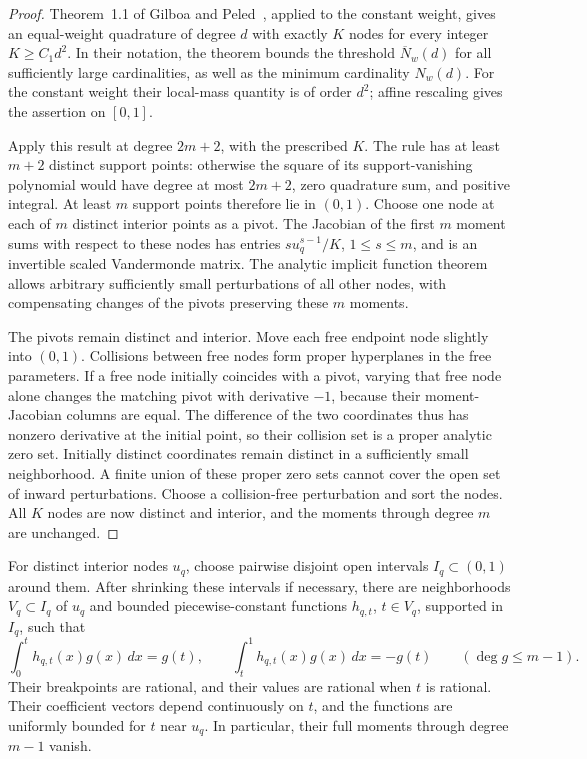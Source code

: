 \begin{proof}
Theorem~1.1 of Gilboa and Peled~\cite{gilboa2017}, applied to the
constant weight, gives an equal-weight quadrature of degree \(d\) with
exactly \(K\) nodes for every integer \(K\geq C_1d^2\).  In their
notation, the theorem bounds the threshold \(\overline N_w(d)\) for
all sufficiently large cardinalities, as well as the minimum
cardinality \(N_w(d)\).  For the constant weight their local-mass
quantity is of order \(d^2\); affine rescaling gives the assertion on
\([0,1]\).

Apply this result at degree \(2m+2\), with the prescribed \(K\).
The rule has at least \(m+2\) distinct support points: otherwise the
square of its support-vanishing polynomial would have degree at most
\(2m+2\), zero quadrature sum, and positive integral.  At least \(m\)
support points therefore lie in \((0,1)\).  Choose one node at each
of \(m\) distinct interior points as a pivot.  The Jacobian of the first
\(m\) moment sums with respect to these nodes has entries
\(s u_q^{s-1}/K\), \(1\leq s\leq m\), and is an invertible scaled
Vandermonde matrix.  The analytic implicit function theorem allows
arbitrary sufficiently small perturbations of all other nodes, with
compensating changes of the pivots preserving these \(m\) moments.

The pivots remain distinct and interior.  Move each free endpoint node
slightly into \((0,1)\).  Collisions between free nodes form proper
hyperplanes in the free parameters.  If a free node initially coincides
with a pivot, varying that free node alone changes the matching pivot
with derivative \(-1\), because their moment-Jacobian columns are
equal.  The difference of the two coordinates thus has nonzero derivative
at the initial point, so their collision set is a proper analytic zero
set.  Initially distinct coordinates remain distinct in a sufficiently
small neighborhood.  A finite union of these proper zero sets cannot
cover the open set of inward perturbations.  Choose a collision-free
perturbation and sort the nodes.  All \(K\) nodes are now distinct and
interior, and the moments through degree \(m\) are unchanged.
\end{proof}

\begin{lemma}\label{individual-centered-bumps}
For distinct interior nodes \(u_q\), choose pairwise disjoint open
intervals \(I_q\subset(0,1)\) around them.  After shrinking these
intervals if necessary, there are neighborhoods \(V_q\subset I_q\)
of \(u_q\) and bounded piecewise-constant functions \(h_{q,t}\),
\(t\in V_q\), supported in \(I_q\), such that
\begin{equation}\label{individual-bump-moments}
  \int_0^t h_{q,t}(x)g(x)\,dx=g(t),\qquad
  \int_t^1 h_{q,t}(x)g(x)\,dx=-g(t)
  \qquad(\deg g\leq m-1).
\end{equation}
Their breakpoints are rational, and their values are rational when
\(t\) is rational.  Their coefficient vectors depend continuously on
\(t\), and the functions are uniformly bounded for \(t\) near \(u_q\).
In particular, their full moments through degree \(m-1\) vanish.
\end{lemma}

